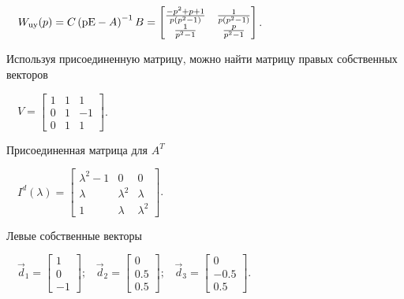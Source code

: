\documentclass[a4paper]{article}
\newcommand\normalsubformula[1]{\text{\mathversion{normal}$#1$}}
\begin{document}
{\begin{russian}\sffamily
\ \ 
$W_{\normalsubformula{\text{uy}}}(p)=C\left(\normalsubformula{\text{pE}}-A\right)^{-1}B=\left[\begin{matrix}\frac{-p^2+p+1}{p(p^2-1)}&\frac
1{p(p^2-1)}\\\frac 1{p^2-1}&\frac p{p^2-1}\end{matrix}\right]$.
\end{russian}}

{\begin{russian}\sffamily
Используя присоединенную матрицу, можно найти матрицу правых собственных векторов
\end{russian}}

{\begin{russian}\sffamily
\ \  $V=\left[\begin{matrix}1&1&1\\0&1&-1\\0&1&1\end{matrix}\right]$.
\end{russian}}

{\begin{russian}\sffamily
Присоединенная матрица для  $A^T$
\end{russian}}

{\begin{russian}\sffamily
\ \  $I^d\left(λ\right)=\left[\begin{matrix}λ^2-1&0&0\\λ&λ^2&λ\\1&λ&λ^2\end{matrix}\right]$.
\end{russian}}

{\begin{russian}\sffamily
Левые собственные векторы
\end{russian}}

{\begin{russian}\sffamily
\ \  $\vec d_1=\left[\begin{matrix}1\\0\\-1\end{matrix}\right];\;\;\;\vec
d_2=\left[\begin{matrix}0\\0.5\\0.5\end{matrix}\right];\;\;\;\vec
d_3=\left[\begin{matrix}0\\-0.5\\0.5\end{matrix}\right]$.
\end{russian}}
\end{document}
